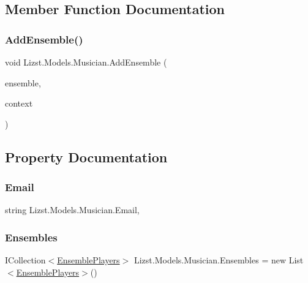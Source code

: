\subsection{Member Function Documentation}
\mbox{\label{class_lizst_1_1_models_1_1_musician_a0fe67fd3c3d28bd654fff32c7b6b69f5}} 
\subsubsection{\texorpdfstring{AddEnsemble()}{AddEnsemble()}}
{\footnotesize\ttfamily void Lizst.\+Models.\+Musician.\+Add\+Ensemble (\begin{DoxyParamCaption}\item[{\mbox{\hyperlink{class_lizst_1_1_models_1_1_ensemble}{Ensemble}}}]{ensemble,  }\item[{\mbox{\hyperlink{class_lizst_1_1_models_1_1_lizst_context}{Lizst\+Context}}}]{context }\end{DoxyParamCaption})}



\subsection{Property Documentation}
\mbox{\label{class_lizst_1_1_models_1_1_musician_a84a1ad47256cfd85feb8ed3b925055b8}} 
\subsubsection{\texorpdfstring{Email}{Email}}
{\footnotesize\ttfamily string Lizst.\+Models.\+Musician.\+Email\hspace{0.3cm}{\ttfamily [get]}, {\ttfamily [set]}}

\mbox{\label{class_lizst_1_1_models_1_1_musician_a2efab9dbef30d0c56cf921fc7795ef2f}} 
\subsubsection{\texorpdfstring{Ensembles}{Ensembles}}
{\footnotesize\ttfamily I\+Collection$<$\mbox{\hyperlink{class_lizst_1_1_models_1_1_ensemble_players}{Ensemble\+Players}}$>$ Lizst.\+Models.\+Musician.\+Ensembles = new List$<$\mbox{\hyperlink{class_lizst_1_1_models_1_1_ensemble_players}{Ensemble\+Players}}$>$()\hspace{0.3cm}{\ttfamily [get]}}

